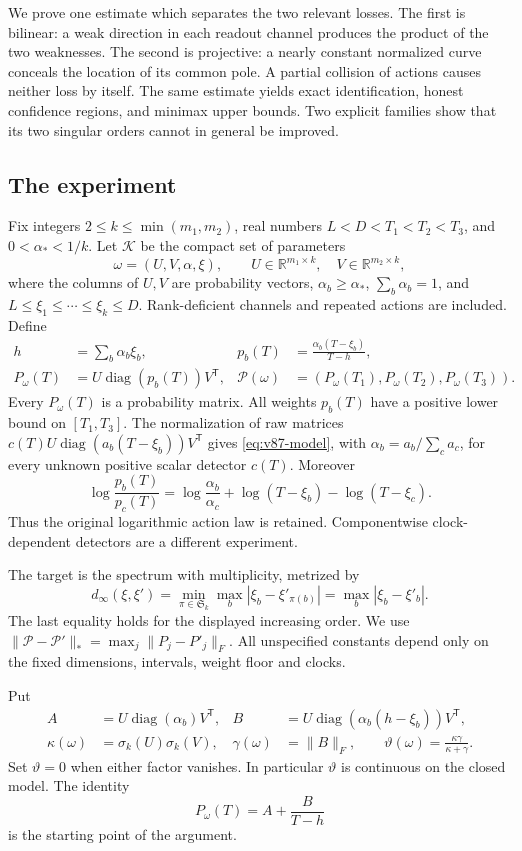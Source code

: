 \documentclass[11pt,reqno]{amsart}
\numberwithin{equation}{section}
\theoremstyle{definition}\newtheorem{definition}[theorem]{Definition}
\theoremstyle{remark}\newtheorem{remark}[theorem]{Remark}
\newcommand{\R}{\mathbb R}
\newcommand{\diag}{\operatorname{diag}}
\newcommand{\cK}{\mathcal K}
\newcommand{\sig}{\vartheta}
\begin{document}
We prove one estimate which separates the two relevant losses. The
first is bilinear: a weak direction in each readout channel produces
the product of the two weaknesses. The second is projective: a nearly
constant normalized curve conceals the location of its common pole.
A partial collision of actions causes neither loss by itself. The
same estimate yields exact identification, honest confidence regions,
and minimax upper bounds. Two explicit families show that its two
singular orders cannot in general be improved.

\subsection{The experiment}
Fix integers $2\le k\le\min(m_1,m_2)$, real numbers
$L<D<T_1<T_2<T_3$, and $0<\alpha_*<1/k$.
Let $\cK$ be the compact set of parameters
\[
 \omega=(U,V,\alpha,\xi),\qquad
 U\in\R^{m_1\times k},\quad V\in\R^{m_2\times k},
\]
where the columns of $U,V$ are probability vectors,
$\alpha_b\ge\alpha_*$, $\sum_b\alpha_b=1$, and
$L\le\xi_1\le\cdots\le\xi_k\le D$.
Rank-deficient channels and repeated actions are included. Define
\begin{align}
 h&=\sum_b\alpha_b\xi_b,&
 p_b(T)&=\frac{\alpha_b(T-\xi_b)}{T-h},\nonumber\\
 P_\omega(T)&=U\diag(p_b(T))V^{\mathsf T},&
 \mathcal P(\omega)&=(P_\omega(T_1),P_\omega(T_2),P_\omega(T_3)).
 \label{eq:v87-model}
\end{align}
Every $P_\omega(T)$ is a probability matrix. All weights $p_b(T)$
have a positive lower bound on $[T_1,T_3]$. The normalization of raw
matrices $c(T)U\diag(a_b(T-\xi_b))V^{\mathsf T}$ gives
\eqref{eq:v87-model}, with $\alpha_b=a_b/\sum_ca_c$, for every
unknown positive scalar detector $c(T)$. Moreover
\[
 \log\frac{p_b(T)}{p_c(T)}
 =\log\frac{\alpha_b}{\alpha_c}+\log(T-\xi_b)-\log(T-\xi_c).
\]
Thus the original logarithmic action law is retained. Componentwise
clock-dependent detectors are a different experiment.

The target is the spectrum with multiplicity, metrized by
\[
 d_\infty(\xi,\xi')=\min_{\pi\in\mathfrak S_k}
          \max_b|\xi_b-\xi'_{\pi(b)}|
        =\max_b|\xi_b-\xi'_b|.
\]
The last equality holds for the displayed increasing order. We use
$\|\mathcal P-\mathcal P'\|_*=\max_j\|P_j-P'_j\|_F$.
All unspecified constants depend only on the fixed dimensions,
intervals, weight floor and clocks.

Put
\begin{align}
 A&=U\diag(\alpha_b)V^{\mathsf T},&
 B&=U\diag(\alpha_b(h-\xi_b))V^{\mathsf T},\nonumber\\
 \kappa(\omega)&=\sigma_k(U)\sigma_k(V),&
 \gamma(\omega)&=\|B\|_F,\qquad
 \sig(\omega)=\frac{\kappa\gamma}{\kappa+\gamma}.
 \label{eq:v87-signal}
\end{align}
Set $\sig=0$ when either factor vanishes. In particular $\sig$ is
continuous on the closed model. The identity
\begin{equation}\label{eq:v87-curve}
                      P_\omega(T)=A+\frac{B}{T-h}
\end{equation}
is the starting point of the argument.
\end{document}
